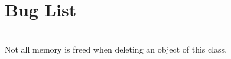 \chapter{Bug List }
\hypertarget{bug}{}\label{bug}

\begin{DoxyRefList}
\item[{\parbox[t]{\linewidth}{Struct \doxylink{structquadratic__equation}{quadratic\+\_\+equation} }}]\hfill \\
\label{bug__bug000001}%
%
Not all memory is freed when deleting an object of this class. 
\end{DoxyRefList}